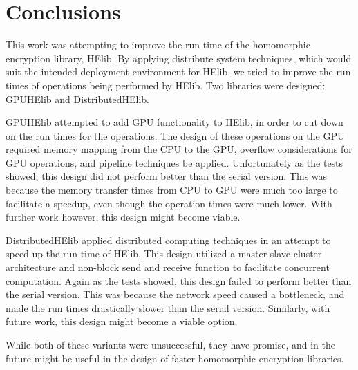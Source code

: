 \chapter{Conclusions} \label{chap:Conclusions}
This work was attempting to improve the run time of the homomorphic encryption library, HElib. By applying distribute system techniques, which would suit the intended deployment environment for HElib, we tried to improve the run times of operations being performed by HElib. Two libraries were designed: GPUHElib and DistributedHElib. 

GPUHElib attempted to add GPU functionality to HElib, in order to cut down on the run times for the operations. The design of these operations on the GPU required memory mapping from the CPU to the GPU, overflow considerations for GPU operations, and pipeline techniques be applied. Unfortunately as the tests showed, this design did not perform better than the serial version. This was because the memory transfer times from CPU to GPU were much too large to facilitate a speedup, even though the operation times were much lower. With further work however, this design might become viable.

DistributedHElib applied distributed computing techniques in an attempt to speed up the run time of HElib. This design utilized a master-slave cluster architecture and non-block send and receive function to facilitate concurrent computation. Again as the tests showed, this design failed to perform better than the serial version. This was because the network speed caused a bottleneck, and made the run times drastically slower than the serial version. Similarly, with future work, this design might become a viable option.

While both of these variants were unsuccessful, they have promise, and in the future might be useful in the design of faster homomorphic encryption libraries.